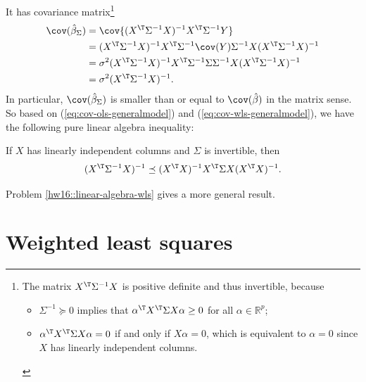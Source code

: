 It has covariance matrix\footnote{The matrix $X^{\T}\Sigma^{-1} X$ is positive definite and thus invertible,
because
\begin{itemize}
\item 
$\Sigma^{-1} \succeq 0$ implies that  $\alpha^{\T}X^{\T}\Sigma X\alpha\geq 0$ for all $\alpha\in\mathbb{R}^{p}$; 

\item 
$\alpha^{\T}X^{\T}\Sigma X\alpha  =0$ if and only if $X\alpha=0$, which is equivalent to $\alpha=0$ since $X$ has linearly independent columns. 
\end{itemize}}
\begin{align}
\cov(\hat{\beta}_{\Sigma}) & =\cov \{ (X^{\T}\Sigma^{-1}X)^{-1}X^{\T}\Sigma^{-1}Y \} \nonumber \\
 & =(X^{\T}\Sigma^{-1}X)^{-1}X^{\T}\Sigma^{-1}\cov(Y)\Sigma^{-1}X(X^{\T}\Sigma^{-1}X)^{-1}\nonumber \\
 & =\sigma^{2}(X^{\T}\Sigma^{-1}X)^{-1}X^{\T}\Sigma^{-1}\Sigma\Sigma^{-1}X(X^{\T}\Sigma^{-1}X)^{-1}\nonumber \\
 & =\sigma^{2}(X^{\T}\Sigma^{-1}X)^{-1}.\label{eq:cov-wls-generalmodel}
\end{align}
In particular, $\cov(\hat{\beta}_{\Sigma})$ is
smaller than or equal to $\cov(\hat{\beta})$ in the matrix sense. 
So based on
(\ref{eq:cov-ols-generalmodel}) and (\ref{eq:cov-wls-generalmodel}),
we have the following pure linear algebra inequality:
\begin{corollary}\label{corollary::WLS-linear-algebra}
If $X$ has linearly independent columns and $\Sigma$ is invertible, then 
\[
(X^{\T}\Sigma^{-1}X)^{-1}\preceq(X^{\T}X)^{-1}X^{\T}\Sigma X(X^{\T}X)^{-1}.
\]
\end{corollary}

Problem \ref{hw16::linear-algebra-wls} gives a more general result. 


\section{Weighted least squares}



